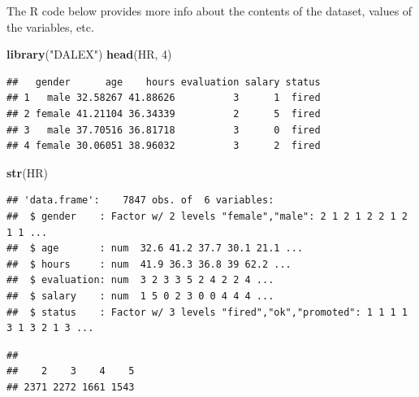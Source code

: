 \documentclass[12pt,]{krantz}
\newenvironment{Shaded}{\begin{snugshade}}{\end{snugshade}}
\newcommand{\DecValTok}[1]{\textcolor[rgb]{0.00,0.00,0.81}{#1}}
\newcommand{\KeywordTok}[1]{\textcolor[rgb]{0.13,0.29,0.53}{\textbf{#1}}}
\newcommand{\NormalTok}[1]{#1}
\newcommand{\OperatorTok}[1]{\textcolor[rgb]{0.81,0.36,0.00}{\textbf{#1}}}
\newcommand{\StringTok}[1]{\textcolor[rgb]{0.31,0.60,0.02}{#1}}
\begin{document}
The R code below provides more info about the contents of the dataset, values of the variables, etc.

\begin{Shaded}
\begin{Highlighting}[]
\KeywordTok{library}\NormalTok{(}\StringTok{"DALEX"}\NormalTok{)}
\KeywordTok{head}\NormalTok{(HR, }\DecValTok{4}\NormalTok{)}
\end{Highlighting}
\end{Shaded}

\begin{verbatim}
##   gender      age    hours evaluation salary status
## 1   male 32.58267 41.88626          3      1  fired
## 2 female 41.21104 36.34339          2      5  fired
## 3   male 37.70516 36.81718          3      0  fired
## 4 female 30.06051 38.96032          3      2  fired
\end{verbatim}

\begin{Shaded}
\begin{Highlighting}[]
\KeywordTok{str}\NormalTok{(HR)}
\end{Highlighting}
\end{Shaded}

\begin{verbatim}
## 'data.frame':    7847 obs. of  6 variables:
##  $ gender    : Factor w/ 2 levels "female","male": 2 1 2 1 2 2 1 2 1 1 ...
##  $ age       : num  32.6 41.2 37.7 30.1 21.1 ...
##  $ hours     : num  41.9 36.3 36.8 39 62.2 ...
##  $ evaluation: num  3 2 3 3 5 2 4 2 2 4 ...
##  $ salary    : num  1 5 0 2 3 0 0 4 4 4 ...
##  $ status    : Factor w/ 3 levels "fired","ok","promoted": 1 1 1 1 3 1 3 2 1 3 ...
\end{verbatim}

\begin{Shaded}
\end{Shaded}

\begin{verbatim}
## 
##    2    3    4    5 
## 2371 2272 1661 1543
\end{verbatim}

\begin{Shaded}
\end{Shaded}
\end{document}
